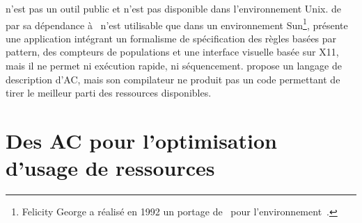  n'est pas un outil public et n'est pas disponible dans
l'environnement Unix. %
 de par sa dépendance à~ n'est
utilisable que dans un environnement Sun\footnote{%
  Felicity George a réalisé en 1992 un portage de~ pour
  l'environnement~.}, %
 présente une application intégrant un formalisme de
spécification des règles basées par pattern, des compteurs de
populations et une interface visuelle basée sur X11, mais il ne permet ni
exécution rapide, ni séquencement. %
 propose un langage de description d'AC, mais son
compilateur ne produit pas un code permettant de tirer le meilleur
parti des ressources disponibles. %

\section{Des AC pour l'optimisation d'usage de ressources}

